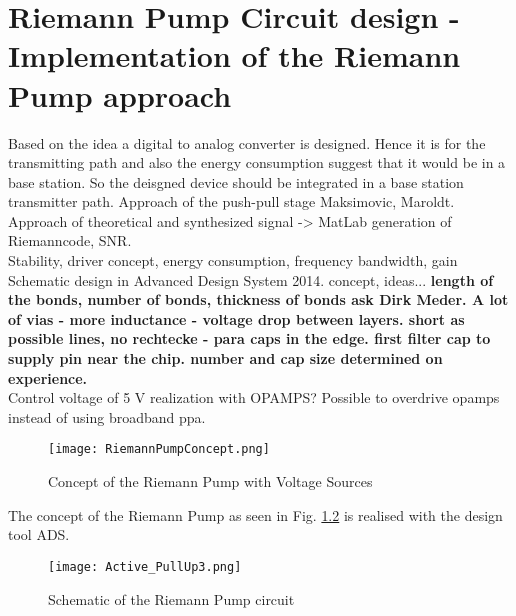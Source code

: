\chapter{Riemann Pump Circuit design - Implementation of the Riemann Pump approach}
Based on the idea a digital to analog converter is designed. Hence it is for the transmitting path and also the energy consumption suggest that it would be in a base station. So the deisgned device should be integrated in a base station transmitter path.
Approach of the push-pull stage Maksimovic, Maroldt.\\
Approach of theoretical and synthesized signal -> MatLab generation of Riemanncode, SNR.\\ Stability, driver concept, energy consumption, frequency bandwidth, gain
Schematic design in Advanced Design System 2014. concept, ideas... 
\textbf{length of the bonds, number of bonds, thickness of bonds ask Dirk Meder. A lot of vias - more inductance - voltage drop between layers. short as possible lines, no rechtecke - para caps in the edge. first filter cap to supply pin near the chip. number and cap size determined on experience. }\\
Control voltage of 5 V realization with OPAMPS? Possible to overdrive opamps instead of using broadband ppa. 

\begin{figure}[ht]
	\centering
  \texttt{[image: RiemannPumpConcept.png]}
	\caption{Concept of the Riemann Pump with Voltage Sources}
	\label{RiemannPumpConcept}
\end{figure}

The concept of the Riemann Pump as seen in Fig. \ref{RiemannPumpConcept} is realised with the design tool ADS.

\begin{figure}[ht]
	\centering
  \texttt{[image: Active\_PullUp3.png]}
	\caption{Schematic of the Riemann Pump circuit}
	\label{RiemannPumpConcept}
\end{figure}